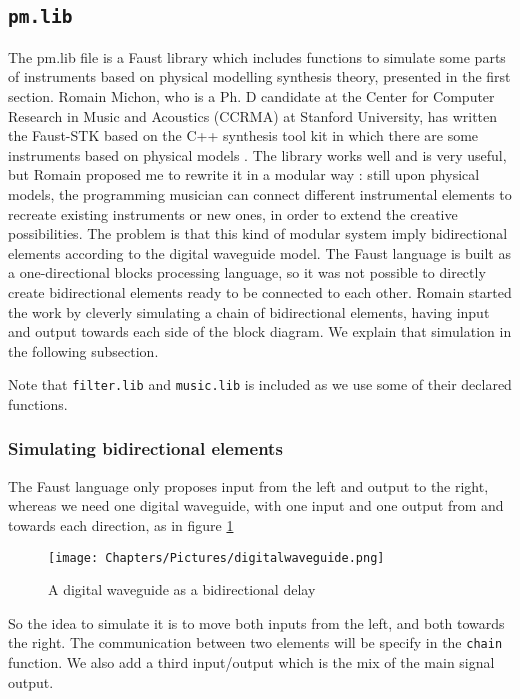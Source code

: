 \subsection{\texttt{pm.lib}}

The pm.lib file is a Faust library which includes functions to simulate some parts of instruments based on physical modelling synthesis theory, presented in the first section.
Romain Michon, who is a Ph. D candidate at the Center for Computer Research in Music and Acoustics (CCRMA) at Stanford University, has written the Faust-STK based on the C++ synthesis tool kit in which there are some instruments based on physical models \cite{fauststk}. The library works well and is very useful, but Romain proposed me to rewrite it in a modular way : still upon physical models, the programming musician can connect different instrumental elements to recreate existing instruments or new ones, in order to extend the creative possibilities. The problem is that this kind of modular system imply bidirectional elements according to the digital waveguide model. The Faust language is built as a one-directional blocks processing language, so it was not possible to directly create bidirectional elements ready to be connected to each other. Romain started the work by cleverly simulating a chain of bidirectional elements, having input and output towards each side of the block diagram. We explain that simulation in the following subsection.

Note that \texttt{filter.lib} and \texttt{music.lib} is included as we use some of their declared functions.

\subsubsection*{Simulating bidirectional elements}

The Faust language only proposes input from the left and output to the right, whereas we need one digital waveguide, with one input and one output from and towards each direction, as in figure \ref{fig:bidirectional}

\begin{figure}[h]
    \centering
    \texttt{[image: Chapters/Pictures/digitalwaveguide.png]}
    \caption{A digital waveguide as a bidirectional delay}
    \label{fig:bidirectional}
\end{figure}

So the idea to simulate it is to move both inputs from the left, and both towards the right. The communication between two elements will be specify in the \texttt{chain} function. We also add a third input/output which is the mix of the main signal output.

